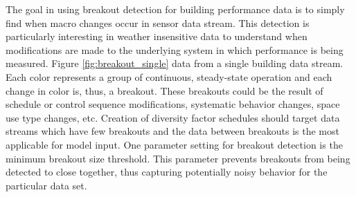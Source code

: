 The goal in using breakout detection for building performance data is to simply find when macro changes occur in sensor data stream. This detection is particularly interesting in weather insensitive data to understand when modifications are made to the underlying system in which performance is being measured. Figure \ref{fig:breakout_single} data from a single building data stream. Each color represents a group of continuous, steady-state operation and each change in color is, thus, a breakout. These breakouts could be the result of schedule or control sequence modifications, systematic behavior changes, space use type changes, etc. Creation of diversity factor schedules should target data streams which have few breakouts and the data between breakouts is the most applicable for model input. One parameter setting for breakout detection is the minimum breakout size threshold. This parameter prevents breakouts from being detected to close together, thus capturing potentially noisy behavior for the particular data set.
